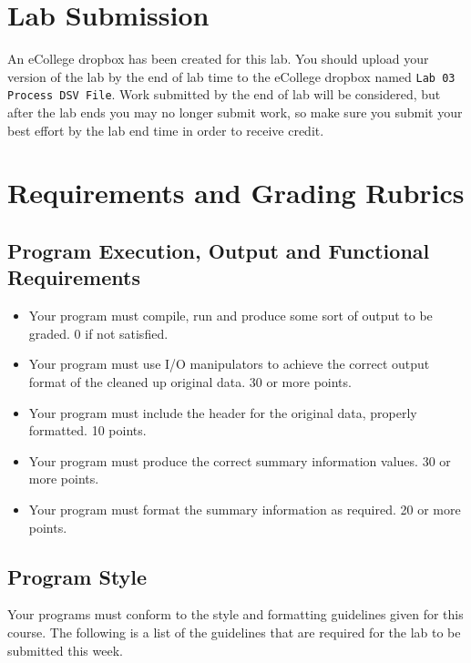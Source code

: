 \documentclass[11pt]{article}
\begin{document}
\section*{Lab Submission}
\label{sec-4}

An eCollege dropbox has been created for this lab.  You should
upload your version of the lab by the end of lab time to the eCollege
dropbox named \verb~Lab 03 Process DSV File~.  Work submitted by the end
of lab will be considered, but after the lab ends you may no longer
submit work, so make sure you submit your best effort by the lab end
time in order to receive credit.
\section*{Requirements and Grading Rubrics}
\label{sec-5}

\subsection*{Program Execution, Output and Functional Requirements}
\label{sec-5-1}

\begin{itemize}
\item Your program must compile, run and produce some sort of output to be
graded. 0 if not satisfied.
\item Your program must use I/O manipulators to achieve the correct output
format of the cleaned up original data.  30 or more points.
\item Your program must include the header for the original data, properly
formatted. 10 points.
\item Your program must produce the correct summary information values. 30
or more points.
\item Your program must format the summary information as required.  20 or
more points.
\end{itemize}

\subsection*{Program Style}
\label{sec-5-2}

Your programs must conform to the style and formatting guidelines given for this course.
The following is a list of the guidelines that are required for the lab to be submitted
this week.
\end{document}
